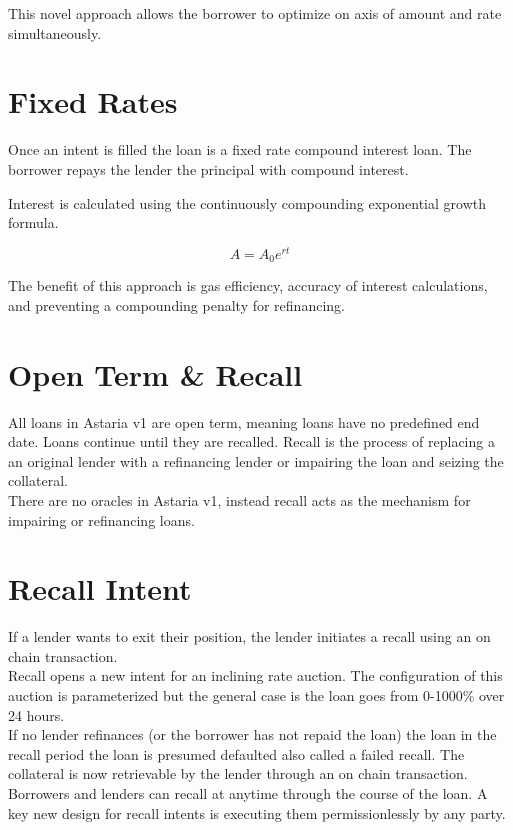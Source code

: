 \documentclass[12pt]{article}
\begin{document}
This novel approach allows the borrower to optimize on axis of amount and rate simultaneously. 

\section{Fixed Rates}
Once an intent is filled the loan is a fixed rate compound interest loan. The borrower repays the lender the principal with compound interest.

Interest is calculated using the continuously compounding exponential growth formula.

$$
A = A_0e^{rt}
$$

The benefit of this approach is gas efficiency, accuracy of interest calculations, and preventing a compounding penalty for refinancing.

\section{Open Term \& Recall}
All loans in Astaria v1 are open term, meaning loans have no predefined end date. Loans continue until they are recalled. Recall is the process of replacing a an original lender with a refinancing lender or impairing the loan and seizing the collateral.\\

There are no oracles in Astaria v1, instead recall acts as the mechanism for impairing or refinancing loans.

\section{Recall Intent}
If a lender wants to exit their position, the lender initiates a recall using an on chain transaction.\\

Recall opens a new intent for an inclining rate auction. The configuration of this auction is parameterized but the general case is the loan goes from 0-1000\% over 24 hours.\\

If no lender refinances (or the borrower has not repaid the loan) the loan in the recall period the loan is presumed defaulted also called a failed recall. The collateral is now retrievable by the lender through an on chain transaction.\\

Borrowers and lenders can recall at anytime through the course of the loan. A key new design for recall intents is executing them permissionlessly by any party.\\
\end{document}
